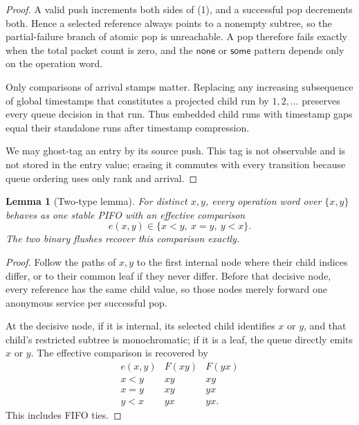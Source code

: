 \documentclass[11pt]{article}
\newtheorem{lemma}[definition]{Lemma}
\begin{document}
\begin{proof}
A valid push increments both sides of (1), and a successful pop decrements both.  Hence a selected reference always points to a nonempty subtree, so the partial-failure branch of atomic pop is unreachable.  A pop therefore fails exactly when the total packet count is zero, and the $\mathsf{none}$ or $\mathsf{some}$ pattern depends only on the operation word.

Only comparisons of arrival stamps matter.  Replacing any increasing subsequence of global timestamps that constitutes a projected child run by $1,2,\ldots$ preserves every queue decision in that run.  Thus embedded child runs with timestamp gaps equal their standalone runs after timestamp compression.

We may ghost-tag an entry by its source push.  This tag is not observable and is not stored in the entry value; erasing it commutes with every transition because queue ordering uses only rank and arrival.
\end{proof}

\begin{lemma}[Two-type lemma]
For distinct $x,y$, every operation word over $\{x,y\}$ behaves as one stable PIFO with an effective comparison
\[
e(x,y)\in\{x<y,\ x=y,\ y<x\}.
\]
The two binary flushes recover this comparison exactly.
\end{lemma}

\begin{proof}
Follow the paths of $x,y$ to the first internal node where their child indices differ, or to their common leaf if they never differ.  Before that decisive node, every reference has the same child value, so those nodes merely forward one anonymous service per successful pop.

At the decisive node, if it is internal, its selected child identifies $x$ or $y$, and that child's restricted subtree is monochromatic; if it is a leaf, the queue directly emits $x$ or $y$.  The effective comparison is recovered by
\begin{equation}
\begin{array}{c|cc}
e(x,y)&F(xy)&F(yx)\\ \hline
x<y&xy&xy\\
x=y&xy&yx\\
y<x&yx&yx.
\end{array}
\tag{2}
\end{equation}
This includes FIFO ties.
\end{proof}
\end{document}
